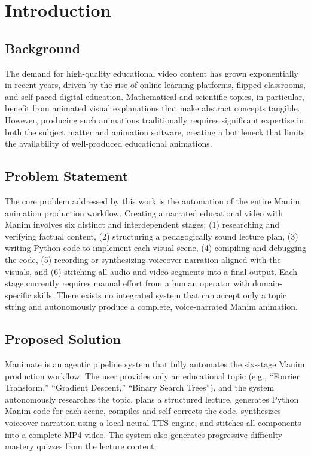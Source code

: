 \documentclass[12pt,a4paper,twoside,openright]{report}
\begin{document}
\chapter{Introduction}

\section{Background}

The demand for high-quality educational video content has grown exponentially in recent years, driven by the rise of online learning platforms, flipped classrooms, and self-paced digital education. Mathematical and scientific topics, in particular, benefit from animated visual explanations that make abstract concepts tangible. However, producing such animations traditionally requires significant expertise in both the subject matter and animation software, creating a bottleneck that limits the availability of well-produced educational animations.

\section{Problem Statement}

The core problem addressed by this work is the automation of the entire Manim animation production workflow. Creating a narrated educational video with Manim involves six distinct and interdependent stages: (1) researching and verifying factual content, (2) structuring a pedagogically sound lecture plan, (3) writing Python code to implement each visual scene, (4) compiling and debugging the code, (5) recording or synthesizing voiceover narration aligned with the visuals, and (6) stitching all audio and video segments into a final output. Each stage currently requires manual effort from a human operator with domain-specific skills. There exists no integrated system that can accept only a topic string and autonomously produce a complete, voice-narrated Manim animation.

\section{Proposed Solution}

Manimate is an agentic pipeline system that fully automates the six-stage Manim production workflow. The user provides only an educational topic (e.g., ``Fourier Transform,'' ``Gradient Descent,'' ``Binary Search Trees''), and the system autonomously researches the topic, plans a structured lecture, generates Python Manim code for each scene, compiles and self-corrects the code, synthesizes voiceover narration using a local neural TTS engine, and stitches all components into a complete MP4 video. The system also generates progressive-difficulty mastery quizzes from the lecture content.
\end{document}
